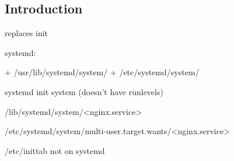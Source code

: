 
\subsection{Introduction}

replaces init

systemd:

+ /usr/lib/systemd/system/
+ /etc/systemd/system/

systemd init system (doesn't have runlevels)

/lib/systemd/system/<nginx.service>

/etc/systemd/system/multi-user.target.wants/<nginx.service>



/etc/inittab not on systemd
